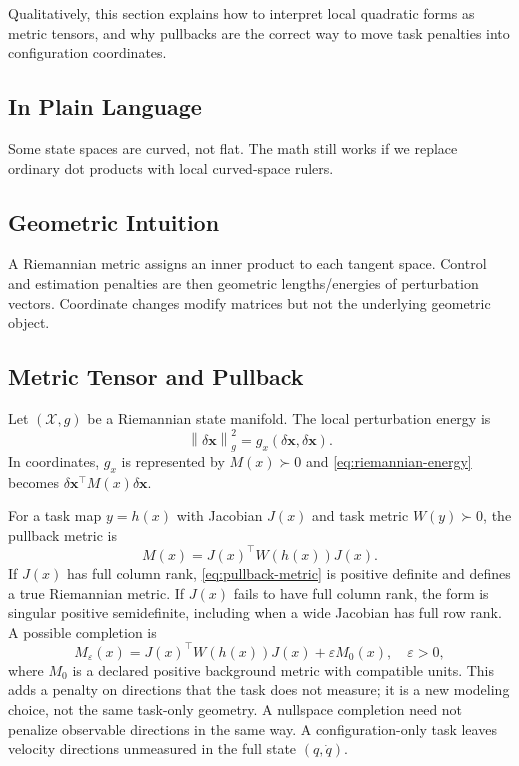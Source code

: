 \documentclass[11pt,letterpaper]{article}
\newcommand{\norm}[1]{\left\lVert #1 \right\rVert}
\newcommand{\dx}{\delta\mathbf{x}}
\begin{document}
Qualitatively, this section explains how to interpret local quadratic forms as metric tensors, and why pullbacks are the correct way to move task penalties into configuration coordinates.

\subsection{In Plain Language}
Some state spaces are curved, not flat. The math still works if we replace ordinary dot products with local curved-space rulers.

\subsection{Geometric Intuition}
A Riemannian metric assigns an inner product to each tangent space. Control and estimation penalties are then geometric lengths/energies of perturbation vectors. Coordinate changes modify matrices but not the underlying geometric object.

\subsection{Metric Tensor and Pullback}
Let $(\mathcal{X},g)$ be a Riemannian state manifold. The local perturbation energy is
\begin{equation}
\norm{\dx}_{g}^2 = g_x(\dx,\dx).
\label{eq:riemannian-energy}
\end{equation}
In coordinates, $g_x$ is represented by $M(x)\succ0$ and \eqref{eq:riemannian-energy} becomes $\dx^\top M(x)\dx$.

For a task map $y=h(x)$ with Jacobian $J(x)$ and task metric $W(y)\succ0$, the pullback metric is
\begin{equation}
M(x) = J(x)^\top W(h(x))J(x).
\label{eq:pullback-metric}
\end{equation}
If $J(x)$ has full column rank, \eqref{eq:pullback-metric} is positive definite and defines a true Riemannian metric. If $J(x)$ fails to have full column rank, the form is singular positive semidefinite, including when a wide Jacobian has full row rank. A possible completion is
\begin{equation}
M_\varepsilon(x) = J(x)^\top W(h(x))J(x) + \varepsilon M_0(x),
\quad \varepsilon>0,
\label{eq:pullback-regularized}
\end{equation}
where $M_0$ is a declared positive background metric with compatible units. This adds a penalty on directions that the task does not measure; it is a new modeling choice, not the same task-only geometry. A nullspace completion need not penalize observable directions in the same way. A configuration-only task leaves velocity directions unmeasured in the full state $(q,\dot q)$.
\end{document}
